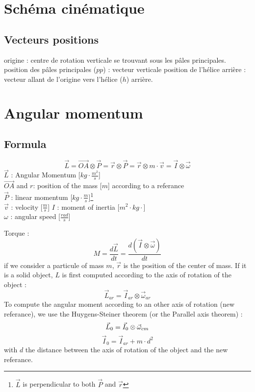 \documentclass[12pt,a4paper]{article}
\begin{document}
	\newpage
	\section{Schéma cinématique}
	
	
	\subsection{Vecteurs positions}
	origine : centre de rotation verticale se trouvant sous les pâles principales.
	\medbreak
	position  des pâles principales ($pp$) : vecteur verticale
	\medbreak
	position de l'hélice arrière : 
	vecteur allant de l'origine vers l'hélice ($h$) arrière. 
	
	
	\newpage
	\section{Angular momentum}
	
	\subsection{Formula}
	\begin{equation}
		\vec{L}=\vec{OA} \otimes \vec{P}=\vec{r} \otimes \vec{P}=\vec{r} \otimes m \cdot \vec{v}=\vec{I} \otimes \vec{\omega}
	\end{equation}
	$\vec{L}$ : Angular Momentum [$kg \cdot \frac{m^2}{s}$]\\
	$\vec{OA}$ and $r$: position of the mass [$m$] according to a referance\\
	$\vec{P}$ : linear momentum [$kg\cdot \frac{m}{s}$]\footnote{$\vec{L}$ is perpendicular to both $\vec{P}$ and $\vec{r}$}\\
	$\vec{v}$ : velocity [$\frac{m}{s}$]
	$I$ : moment of inertia [$m^2 \cdot kg \cdot$]\\
	$\omega$ : angular speed [$\frac{rad}{s}$]
	
	Torque : 
	\begin{equation}
		M = \frac{d\vec{L}}{dt}=\frac{d(\vec{I} \otimes \vec{\omega})}{dt}
	\end{equation}
	\medbreak
	if we consider a particule of mass $m$, $\vec{r}$ is the position of the center of mass.
	If it is a solid object, $L$ is first computed according to the axis of rotation of the object : 
	\begin{equation}
		\vec{L}_{ar}=\vec{I}_{ar} \otimes \vec{\omega}_{ar}
	\end{equation}
	To compute the angular moment according to an other axis of rotation (new referance), we use the Huygens-Steiner theorem (or the Parallel axis theorem) : 
	\begin{equation}
		\vec{L}_{0}=\vec{I}_{0} \otimes \vec{\omega}_{cm}\\
	\end{equation}
	\begin{equation}
		\vec{I}_{0} = \vec{I}_{ar} + m\cdot d^2
	\end{equation}
	with $d$ the distance between the axis of rotation of the object and the new referance. 
\end{document}

